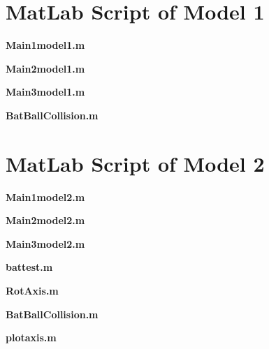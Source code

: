 \appendix
\appendixpage
\begin{subappendices}

\section{MatLab Script of Model 1}

\textbf{Main1model1.m}



\textbf{Main2model1.m}



\textbf{Main3model1.m}



\textbf{BatBallCollision.m}


\section{MatLab Script of Model 2}

\textbf{Main1model2.m}



\textbf{Main2model2.m}



\textbf{Main3model2.m}



\textbf{battest.m}



\textbf{RotAxis.m}


\textbf{BatBallCollision.m}


\textbf{plotaxis.m}

\end{subappendices}
